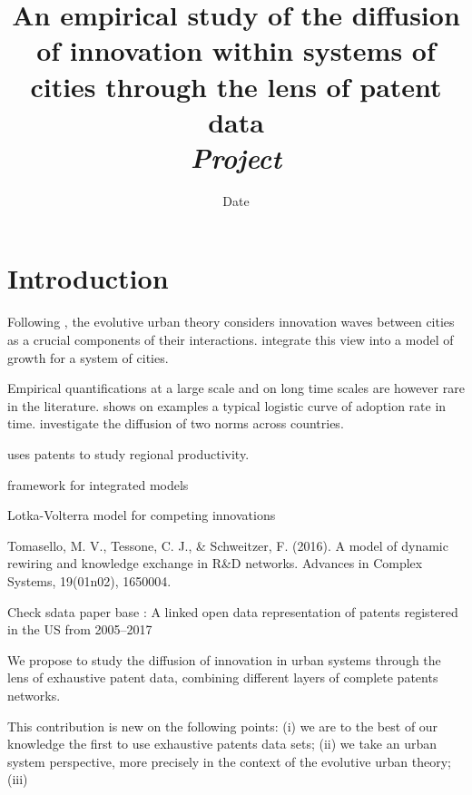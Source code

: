 


\title{An empirical study of the diffusion of innovation within systems of cities through the lens of patent data\\
\textit{Project}
}
\author{}
\date{Date}


\maketitle

\justify


\begin{abstract}

\end{abstract}




\section{Introduction}

Following \cite{hagerstrand1968innovation}, the evolutive urban theory considers innovation waves between cities as a crucial components of their interactions. \cite{favaro2011gibrat} integrate this view into a model of growth for a system of cities.

Empirical quantifications at a large scale and on long time scales are however rare in the literature. \cite{grubler1996time} shows on examples a typical logistic curve of adoption rate in time. \cite{albuquerque2007spatiotemporal} investigate the diffusion of two norms across countries.

\cite{acs2002patents} uses patents to study regional productivity.

\cite{wejnert2002integrating} framework for integrated models

\cite{sonis1983spatio} Lotka-Volterra model for competing innovations


Tomasello, M. V., Tessone, C. J., & Schweitzer, F. (2016). A model of dynamic rewiring and knowledge exchange in R&D networks. Advances in Complex Systems, 19(01n02), 1650004.

Check sdata paper base : A linked open data representation of patents registered in the US from 2005--2017


We propose to study the diffusion of innovation in urban systems through the lens of exhaustive patent data, combining different layers of complete patents networks.

This contribution is new on the following points: (i) we are to the best of our knowledge the first to use exhaustive patents data sets; (ii) we take an urban system perspective, more precisely in the context of the evolutive urban theory; (iii)


